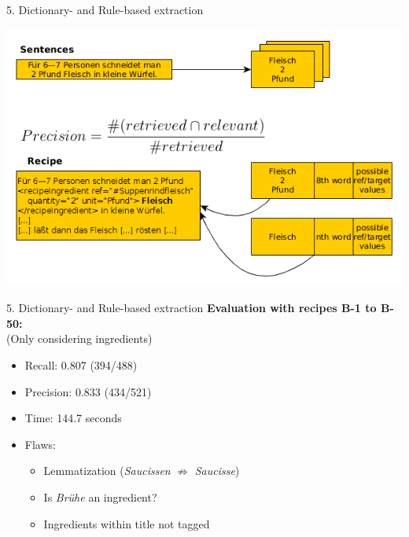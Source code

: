 \documentclass[12pt]{beamer}
\begin{document}
\begin{frame}{5. Dictionary- and Rule-based extraction}
	\begin{center}
		\includegraphics[width=1\linewidth, height=1\textheight, keepaspectratio]{../../Images/precision}
	\end{center}
\end{frame}

\begin{frame}{5. Dictionary- and Rule-based extraction}
	\textbf{Evaluation with recipes B-1 to B-50:}\\
	\hspace{1cm}(Only considering ingredients)\\
	\begin{itemize}
		\item Recall: 0.807 (394/488)
		\item Precision: 0.833 (434/521)
		\item Time: 144.7 seconds
		\item Flaws:
		\begin{itemize}
			\item Lemmatization (\textit{Saucissen} $\not\Rightarrow$ \textit{Saucisse})
			\item Is \textit{Brühe} an ingredient?
			\item Ingredients within title not tagged
		\end{itemize}
	\end{itemize}
\end{frame}
\end{document}

